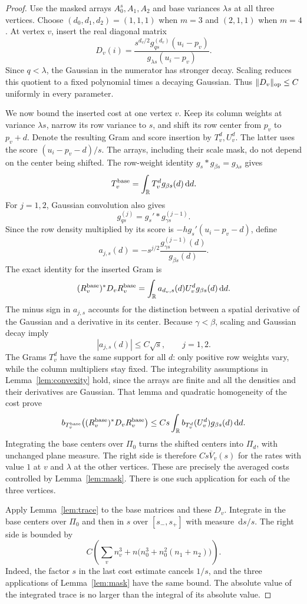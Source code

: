 \documentclass[11pt]{article}
\theoremstyle{remark}\newtheorem{remark}[theorem]{Remark}
\newcommand{\R}{\mathbb R}\newcommand{\C}{\mathbb C}
\newcommand{\dd}{\,\mathrm d}\newcommand{\tr}{\operatorname{tr}}
\begin{document}
\begin{proof}
Use the masked arrays $A_0^s,A_1,A_2$ and base variances $\lambda s$ at all three vertices. Choose $(d_0,d_1,d_2)=(1,1,1)$ when $m=3$ and $(2,1,1)$ when $m=4$. At vertex $v$, insert the real diagonal matrix
\[
 D_v(i)=\frac{s^{d_v/2}g_{qs}^{(d_v)}(u_i-p_v)}{g_{\lambda s}(u_i-p_v)}.
\]
Since $q<\lambda$, the Gaussian in the numerator has stronger decay. Scaling reduces this quotient to a fixed polynomial times a decaying Gaussian. Thus $\|D_v\|_{\mathrm{op}}\leq C$ uniformly in every parameter.

We now bound the inserted cost at one vertex $v$. Keep its column weights at variance $\lambda s$, narrow its row variance to $s$, and shift its row center from $p_v$ to $p_v+d$. Denote the resulting Gram and score insertion by $T_v^d,U_v^d$. The latter uses the score $(u_i-p_v-d)/s$. The arrays, including their scale mask, do not depend on the center being shifted. The row-weight identity $g_s*g_{\beta s}=g_{\lambda s}$ gives
\[
 T_v^{\rm base}=\int_\R T_v^d g_{\beta s}(d)\dd d.
\]
For $j=1,2$, Gaussian convolution also gives
\[
 g_{qs}^{(j)}=g_s'*g_{\gamma s}^{(j-1)}.
\]
Since the row density multiplied by its score is $-h g_s'(u_i-p_v-d)$, define
\[
 a_{j,s}(d)=-s^{j/2}\frac{g_{\gamma s}^{(j-1)}(d)}{g_{\beta s}(d)}.
\]
The exact identity for the inserted Gram is
\[
 (R_v^{\rm base})^*D_vR_v^{\rm base}
 =\int_\R a_{d_v,s}(d)U_v^d g_{\beta s}(d)\dd d.
\]
The minus sign in $a_{j,s}$ accounts for the distinction between a spatial derivative of the Gaussian and a derivative in its center. Because $\gamma<\beta$, scaling and Gaussian decay imply
\[
 |a_{j,s}(d)|\leq C\sqrt s,\qquad j=1,2.
\]
The Grams $T_v^d$ have the same support for all $d$: only positive row weights vary, while the column multipliers stay fixed. The integrability assumptions in Lemma~\ref{lem:convexity} hold, since the arrays are finite and all the densities and their derivatives are Gaussian. That lemma and quadratic homogeneity of the cost prove
\[
 b_{T_v^{\rm base}}\bigl((R_v^{\rm base})^*D_vR_v^{\rm base}\bigr)
 \leq Cs\int_\R b_{T_v^d}(U_v^d)g_{\beta s}(d)\dd d.
\]
Integrating the base centers over $\Pi_0$ turns the shifted centers into $\Pi_d$, with unchanged plane measure. The right side is therefore $Cs\overline V_v(s)$ for the rates with value $1$ at $v$ and $\lambda$ at the other vertices. These are precisely the averaged costs controlled by Lemma~\ref{lem:mask}. There is one such application for each of the three vertices.

Apply Lemma~\ref{lem:trace} to the base matrices and these $D_v$. Integrate in the base centers over $\Pi_0$ and then in $s$ over $[s_-,s_+]$ with measure $\dd s/s$. The right side is bounded by
\[
 C\left(\sum_v n_v^3+n\bigl(n_0^3+n_0^2(n_1+n_2)\bigr)\right).
\]
Indeed, the factor $s$ in the last cost estimate cancels $1/s$, and the three applications of Lemma~\ref{lem:mask} have the same bound. The absolute value of the integrated trace is no larger than the integral of its absolute value.


\end{proof}
\end{document}

